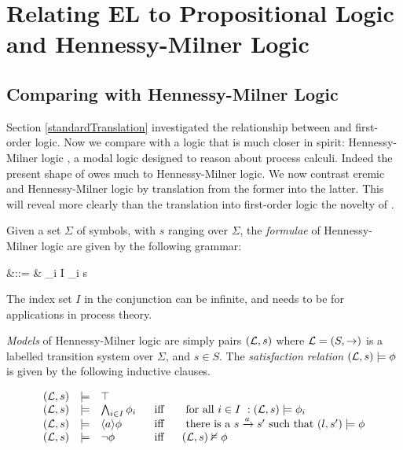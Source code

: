 
\section{Relating EL to Propositional Logic and Hennessy-Milner Logic}

\subsection{Comparing \ELABR{} with Hennessy-Milner Logic}

Section \ref{standardTranslation} investigated the relationship
between \ELABR{} and first-order logic. Now we compare \ELABR{} with a
logic that is much closer in spirit: Hennessy-Milner logic
\cite{HennessyM:alglawfndac}, a modal logic designed to reason about
process calculi. Indeed the present shape of \ELABR{} owes much to
Hennessy-Milner logic. We now contrast eremic and Hennessy-Milner
logic by translation from the former into the latter.  This will
reveal more clearly than the translation into first-order logic the
novelty of \ELABR{}.

Given a set $\Sigma$ of symbols, with $s$ ranging over
$\Sigma$, the \emph{formulae} of Hennessy-Milner logic are given
by the following grammar:
\begin{GRAMMAR}
  \phi 
     &\quad ::= \quad & 
  \top \fOr \BIGAND_{i \in I} \phi_i  \fOr \langle s \rangle \phi \fOr \neg \phi 
\end{GRAMMAR}

\NI The index set $I$ in the conjunction can be infinite, and needs to
be for applications in process theory.

 \emph{Models} of Hennessy-Milner logic are simply pairs $(\mathcal{L}, s)$
 where $\mathcal{L} = (S, \rightarrow)$ is a labelled transition system over
 $\Sigma$, and $s \in S$.  The \emph{satisfaction relation} $(\mathcal{L}, s)
 \models \phi$ is given by the following inductive clauses.

\[
\begin{array}{lclcl}
  (\mathcal{L}, s) 
     & \models & 
  \top  \\
  (\mathcal{L}, s) 
     & \models & 
  \bigwedge_{i \in I} \phi_i  &\  \mbox{ iff }\  & \mbox { for all $i \in I$ }: (\mathcal{L}, s) \models \phi_i  \\
  (\mathcal{L}, s) 
     & \models & 
  \langle a \rangle \phi & \mbox{ iff } & \mbox{ there is a } s \xrightarrow{a} s' \mbox { such that } (l,s') \models \phi  \\
  (\mathcal{L}, s) 
     & \models & 
  \neg \phi & \mbox{ iff } & (\mathcal{L}, s)  \nvDash \phi 
\end{array}
\]

